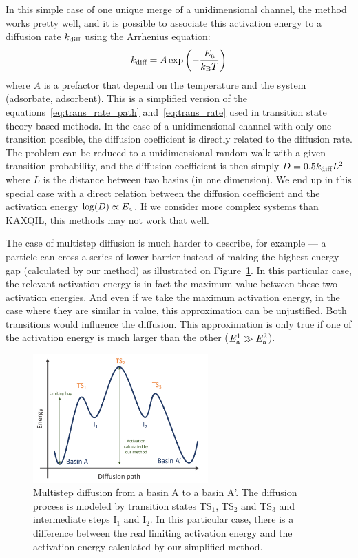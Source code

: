 \documentclass[main]{subfiles}
\begin{document}
In this simple case of one unique merge of a unidimensional channel, the method works pretty well, and it is possible to associate this activation energy to a diffusion rate $k_{\text{diff}}$ using the Arrhenius equation:
\begin{equation}
  k_{\text{diff}} = A \exp\left(-\frac{E_{\text{a}}}{k_{\text{B}}T}\right)
\end{equation}
where $A$ is a prefactor that depend on the temperature and the system (adsorbate, adsorbent). This is a simplified version of the equations~\ref{eq:trans_rate_path} and~\ref{eq:trans_rate} used in transition state theory-based methods. In the case of a unidimensional channel with only one transition possible, the diffusion coefficient is directly related to the diffusion rate. The problem can be reduced to a unidimensional random walk with a given transition probability, and the diffusion coefficient is then simply $D=0.5k_{\text{diff}}L^2$ where $L$ is the distance between two basins (in one dimension). We end up in this special case with a direct relation between the diffusion coefficient and the activation energy $\log(D)\propto E_{\text{a}}$.
If we consider more complex systems than KAXQIL, this methods may not work that well. 

The case of multistep diffusion is much harder to describe, for example --- a particle can cross a series of lower barrier instead of making the highest energy gap (calculated by our method) as illustrated on Figure~\ref{fgr:TS_problem}. In this particular case, the relevant activation energy is in fact the maximum value between these two activation energies. And even if we take the maximum activation energy, in the case where they are similar in value, this approximation can be unjustified. Both transitions would influence the diffusion. This approximation is only true if one of the activation energy is much larger than the other ($E_{\text{a}}^1 \gg E_{\text{a}}^2$).

\begin{figure}[ht]
  \centering
    \includegraphics[width=0.6\textwidth]{figures/5-diffusion/Diffusion_TS.pdf}
    \caption{Multistep diffusion from a basin A to a basin A'. The diffusion process is modeled by transition states TS$_1$, TS$_2$ and TS$_3$ and intermediate steps I$_1$ and I$_2$. In this particular case, there is a difference between the real limiting activation energy and the activation energy calculated by our simplified method. }\label{fgr:TS_problem}
\end{figure}
\end{document}
